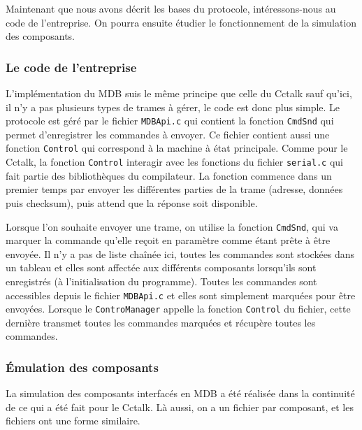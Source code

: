 \documentclass[a4paper]{article}
\begin{document}
Maintenant que nous avons décrit les bases du protocole, intéressons-nous au
code de l'entreprise. On pourra ensuite étudier le fonctionnement de la
simulation des composants.

\subsubsection{Le code de l'entreprise}

L'implémentation du MDB suis le même principe que celle du Cctalk sauf qu'ici,
il n'y a pas plusieurs types de trames à gérer, le code est donc plus simple. Le
protocole est géré par le fichier \verb|MDBApi.c| qui contient la fonction
\verb|CmdSnd| qui permet d'enregistrer les commandes à envoyer. Ce fichier
contient aussi une fonction \verb|Control| qui correspond à la machine à état
principale. Comme pour le Cctalk, la fonction \verb|Control| interagir avec les
fonctions du fichier \verb|serial.c| qui fait partie des bibliothèques du
compilateur. La fonction commence dans un premier temps par envoyer les
différentes parties de la trame (adresse, données puis checksum), puis attend
que la réponse soit disponible.

Lorsque l'on souhaite envoyer une trame, on utilise la fonction \verb|CmdSnd|,
qui va marquer la commande qu'elle reçoit en paramètre comme étant prête à être
envoyée. Il n'y a pas de liste chaînée ici, toutes les commandes sont stockées
dans un tableau et elles sont affectée aux différents composants lorsqu'ils sont
enregistrés (à l'initialisation du programme). Toutes les commandes sont
accessibles depuis le fichier \verb|MDBApi.c| et elles sont simplement marquées
pour être envoyées. Lorsque le \verb|ControManager| appelle la fonction
\verb|Control| du fichier, cette dernière transmet toutes les commandes marquées
et récupère toutes les commandes.

\subsubsection{Émulation des composants}

La simulation des composants interfacés en MDB a été réalisée dans la continuité
de ce qui a été fait pour le Cctalk. Là aussi, on a un fichier par composant, et
les fichiers ont une forme similaire.
\end{document}
